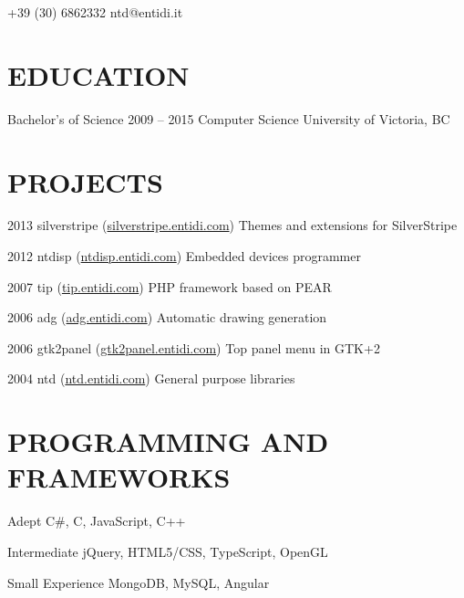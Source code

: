 \documentclass[10pt]{tccv}
\begin{document}
    {+39 (30) 6862332}
    {ntd@entidi.it}

\section{EDUCATION}

\begin{yearlist}

\item[Bachelor's of Science]{2009 -- 2015}
     {Computer Science}
     {University of Victoria, BC}

\end{yearlist}

\section{PROJECTS}

\begin{yearlist}

\item{2013}
     {silverstripe (\href{http://silverstripe.entidi.com/}{silverstripe.entidi.com})}
     {Themes and extensions for SilverStripe}

\item{2012}
     {ntdisp (\href{http://ntdisp.entidi.com/}{ntdisp.entidi.com})}
     {Embedded devices programmer}

\item{2007}
     {tip (\href{http://tip.entidi.com/}{tip.entidi.com})}
     {PHP framework based on PEAR}

\item{2006}
     {adg (\href{http://adg.entidi.com/}{adg.entidi.com})}
     {Automatic drawing generation}

\item{2006}
     {gtk2panel (\href{http://gtk2panel.entidi.com/}{gtk2panel.entidi.com})}
     {Top panel menu in GTK+2}

\item{2004}
     {ntd (\href{http://ntd.entidi.com/}{ntd.entidi.com})}
     {General purpose libraries}

\end{yearlist}

\section{PROGRAMMING AND FRAMEWORKS}

\begin{factlist}

\item{Adept}
     {C\#, C, JavaScript, C++}
     
\item{Intermediate}
	 {jQuery, HTML5/CSS, TypeScript, OpenGL}

\item{Small Experience}
     {MongoDB, MySQL, Angular}

\end{factlist}
\end{document}
